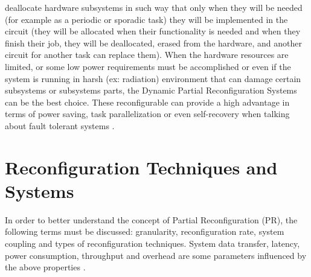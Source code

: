 \documentclass[twoside]{romjist}
\begin{document}
	deallocate hardware subsystems in such way that only when they will be needed (for example
	as a periodic or sporadic task) they will be implemented in the circuit (they will be allocated
	when their functionality is needed and when they finish their job, they will be deallocated,
	erased from the hardware, and another circuit for another task can replace them). When the
	hardware resources are limited, or some low power requirements must be accomplished or
	even if the system is running in harsh (ex: radiation) \cite{8} environment that can damage certain
	subsystems or subsystems parts, the Dynamic Partial Reconfiguration Systems can be the best
	choice. These reconfigurable can provide a high advantage in terms of power saving, task
	parallelization or even self-recovery when talking about fault tolerant systems \cite{2}.
	
	\section{Reconfiguration Techniques and Systems}
	\hspace{0.5cm}
	In order to better understand the concept of Partial Reconfiguration (PR), the following terms
	must be discussed: granularity, reconfiguration rate, system coupling and types of
	reconfiguration techniques. System data transfer, latency, power consumption, throughput and
	overhead are some parameters influenced by the above properties \cite{1} \cite{2}.
	
\end{document}
